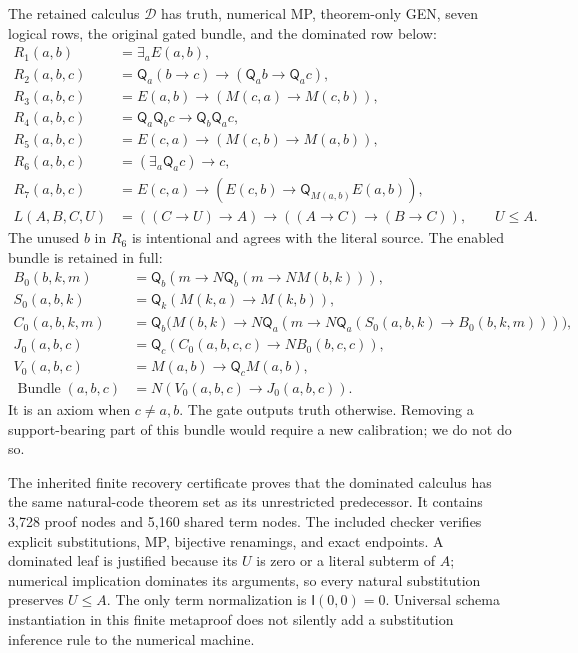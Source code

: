 \documentclass[11pt]{article}
\newcommand{\imp}{\mathsf I}
\newcommand{\quant}{\mathsf Q}
\newcommand{\calD}{\mathcal D}
\begin{document}
The retained calculus $\calD$ has truth, numerical MP, theorem-only
GEN, seven logical rows, the original gated bundle, and the dominated
row below:
\begin{align*}
 R_1(a,b)&=\exists_aE(a,b),\\
 R_2(a,b,c)&=\quant_a(b\to c)\to(\quant_ab\to\quant_ac),\\
 R_3(a,b,c)&=E(a,b)\to(M(c,a)\to M(c,b)),\\
 R_4(a,b,c)&=\quant_a\quant_bc\to\quant_b\quant_ac,\\
 R_5(a,b,c)&=E(c,a)\to(M(c,b)\to M(a,b)),\\
 R_6(a,b,c)&=(\exists_a\quant_ac)\to c,\\
 R_7(a,b,c)&=E(c,a)\to(E(c,b)\to\quant_{M(a,b)}E(a,b)),\\
 L(A,B,C,U)&=((C\to U)\to A)\to((A\to C)\to(B\to C)),
 \qquad U\le A.
\end{align*}
The unused $b$ in $R_6$ is intentional and agrees with the literal source.
The enabled bundle is retained in full:
\begin{align*}
 B_0(b,k,m)&=\quant_b(m\to N\quant_b(m\to NM(b,k))),\\
 S_0(a,b,k)&=\quant_k(M(k,a)\to M(k,b)),\\
 C_0(a,b,k,m)&=\quant_b\bigl(M(b,k)\to
       N\quant_a(m\to N\quant_a(S_0(a,b,k)\to B_0(b,k,m)))\bigr),\\
 J_0(a,b,c)&=\quant_c(C_0(a,b,c,c)\to NB_0(b,c,c)),\\
 V_0(a,b,c)&=M(a,b)\to\quant_cM(a,b),\\
 \operatorname{Bundle}(a,b,c)&=N(V_0(a,b,c)\to J_0(a,b,c)).
\end{align*}
It is an axiom when $c\ne a,b$. The gate outputs truth otherwise.
Removing a support-bearing part of this bundle would require a new
calibration; we do not do so.

The inherited finite recovery certificate proves that the dominated
calculus has the same natural-code theorem set as its unrestricted
predecessor. It contains 3,728 proof nodes and 5,160 shared term nodes.
The included checker verifies explicit substitutions, MP, bijective
renamings, and exact endpoints. A dominated leaf is justified because
its $U$ is zero or a literal subterm of $A$; numerical implication
dominates its arguments, so every natural substitution preserves
$U\le A$. The only term normalization is $\imp(0,0)=0$.
Universal schema instantiation in this finite metaproof does not
silently add a substitution inference rule to the numerical machine.
\end{document}
